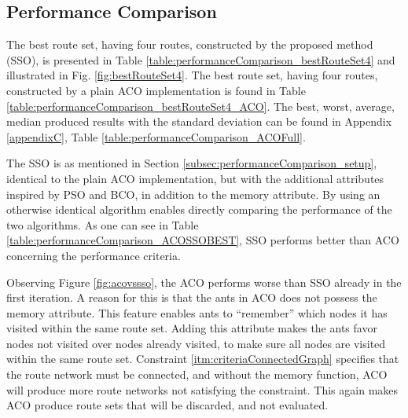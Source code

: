 \subsection{Performance Comparison}
\label{subsec:performanceComparisonDiscussion}


The best route set, having four routes, constructed by the proposed method (SSO), is presented in Table \vref{table:performanceComparison_bestRouteSet4} and illustrated in Fig. \vref{fig:bestRouteSet4}. The best route set, having four routes, constructed by a plain ACO implementation is found in Table \vref{table:performanceComparison_bestRouteSet4_ACO}. The best, worst, average, median produced results with the standard deviation can be found in Appendix \ref{appendixC}, Table \vref{table:performanceComparison_ACOFull}. 

The SSO is as mentioned in Section \vref{subsec:performanceComparison_setup}, identical to the plain ACO implementation, but with the additional attributes inspired by PSO and BCO, in addition to the memory attribute. By using an otherwise identical algorithm enables directly comparing the performance of the two algorithms. As one can see in Table \vref{table:performanceComparison_ACOSSOBEST}, SSO performs better than ACO concerning the performance criteria. 

Observing Figure \ref{fig:acovssso}, the ACO performs worse than SSO already in the first iteration. A reason for this is that the ants in ACO does not possess the memory attribute. This feature enables ants to ``remember'' which nodes it has visited within the same route set. Adding this attribute makes the ants favor nodes not visited over nodes already visited, to make sure all nodes are visited within the same route set. Constraint \vref{itm:criteriaConnectedGraph} specifies that the route network must be connected, and without the memory function, ACO will produce more route networks not satisfying the constraint. This again makes ACO produce route sets that will be discarded, and not evaluated. %

